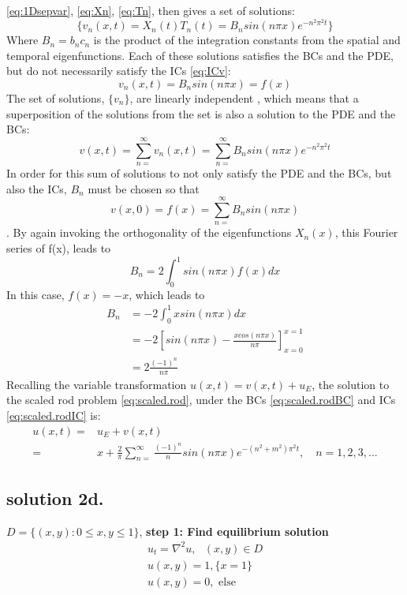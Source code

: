 \documentclass[%
oneside,                 %
final,                   %
10pt]{article}
\begin{document}
\eqref{eq:1Dsepvar}, \eqref{eq:Xn}, \eqref{eq:Tn}, then gives a set of solutions:
\begin{equation}
\{ v_n(x,t)=X_n(t)T_n(t)=B_n sin(n\pi x)e^{-n^2\pi^2t} \}
\end{equation}
Where $B_n=b_n c_n$ is the product of the integration constants from the spatial and temporal eigenfunctions. Each of these solutions satisfies the BCs and the PDE, but do not necessarily satisfy the ICs \eqref{eq:ICv}:
\begin{equation*}
v_n(x,t)=B_n sin(n\pi x)=f(x)
\end{equation*}
The set of solutions, $\{v_n\}$, are linearly independent \citep[p.150]{ravi}, which means that a superposition of the solutions from the set is also a solution to the PDE and the BCs:
\begin{equation}
v(x,t)=\sum_{n=}^{\infty} v_n(x,t)  =\sum_{n=}^{\infty} B_n sin(n\pi x) e^{-n^2\pi^2t}
\end{equation}
In order for this sum of solutions to not only satisfy the PDE and the BCs, but also the ICs, $B_n$ must be chosen so that 
\begin{equation}
v(x,0)=f(x)=\sum_{n=}^{\infty} B_n sin(n\pi x)
\end{equation}.
By again invoking the orthogonality of the eigenfunctions $X_n(x)$, this Fourier series of f(x), leads to
\begin{equation}
B_n=2 \int_0^1 sin(n\pi x)f(x) dx
\end{equation}
In this case, $f(x)=-x$, which leads to
\begin{align*}
B_n&=-2 \int_0^1 xsin(n\pi x) dx \\
&=-2\left[sin(n\pi x)- \frac{x cos(n\pi x)}{n\pi}\right]_{x=0}^{x=1} \\
&=2\frac{(-1)^n}{n\pi}
\end{align*}
Recalling the variable transformation $u(x,t)=v(x,t)+u_E$, the solution to the scaled rod problem \eqref{eq:scaled.rod}, under the BCs \eqref{eq:scaled.rodBC} and ICs \eqref{eq:scaled.rodIC} is: 
\begin{align}
u(x,t)=&u_E+v(x,t) \\
=& x + \frac{2}{\pi}\sum_{n=}^{\infty} \frac{(-1)^{n}}{n} sin(n\pi x) e^{-(n^2+m^2)\pi^2t}, \quad n=1,2,3,... 
\end{align}





\subsection{solution 2d.}
$D=\{(x,y):0\leq x,y \leq 1\}$, \newline
\textbf{step 1: Find equilibrium solution}
\begin{align}
u_t=\nabla^2 u, \text{   } (x,y)\in D \\
u(x,y)=1, \{x=1\} \\
u(x,y)=0, \text{ else}
\end{align}
\end{document}
